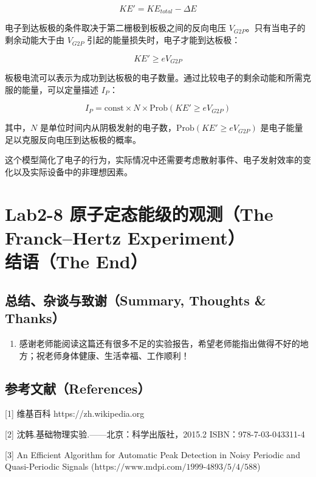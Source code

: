 \documentclass[dvipsnames, svgnames,a4paper,11pt]{article}
\begin{document}
	\[ KE' = KE_{total} - \Delta E \]
	
	电子到达板极的条件取决于第二栅极到板极之间的反向电压 \(V_{G2P}\)。只有当电子的剩余动能大于由 \(V_{G2P}\) 引起的能量损失时，电子才能到达板极：
	
	\[ KE' \geq e V_{G2P} \]
	
	板极电流可以表示为成功到达板极的电子数量。通过比较电子的剩余动能和所需克服的能量，可以定量描述 \(I_P\)：
	
	\[ I_P = \text{const} \times N \times \text{Prob}(KE' \geq e V_{G2P}) \]
	
	其中，\(N\) 是单位时间内从阴极发射的电子数，\(\text{Prob}(KE' \geq e V_{G2P})\) 是电子能量足以克服反向电压到达板极的概率。
	
	这个模型简化了电子的行为，实际情况中还需要考虑散射事件、电子发射效率的变化以及实际设备中的非理想因素。
		
	
	
	\clearpage
	
	\section{Lab2-8 原子定态能级的观测（The Franck–Hertz Experiment）\\ \quad\heiti 结语（The End）}
	
	\subsection{总结、杂谈与致谢（Summary, Thoughts \& Thanks）}
	\begin{enumerate}
		\item 感谢老师能阅读这篇还有很多不足的实验报告，希望老师能指出做得不好的地方；祝老师身体健康、生活幸福、工作顺利！
	\end{enumerate}
	
	\subsection{参考文献（References）}
	[1] 维基百科 https://zh.wikipedia.org
	
	[2] 沈韩.基础物理实验.——北京：科学出版社，2015.2 ISBN：978-7-03-043311-4
	
	[3] An Efficient Algorithm for Automatic Peak Detection in Noisy Periodic and Quasi-Periodic Signals ($\text{https://www.mdpi.com/1999-4893/5/4/588}$)
	
	
\end{document}
